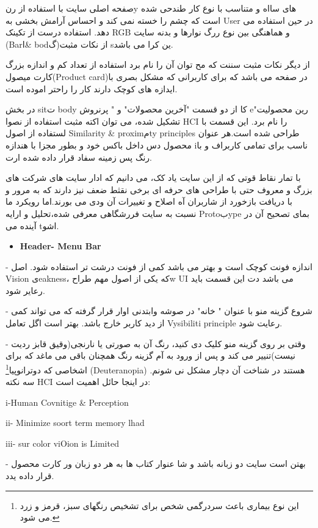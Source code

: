 \documentclass[13pt]{article}
\begin{document}
صفحه اصلی سایت با استفاده از رنy های سااه و متناسب با نوع کار طندحی شده است که
چشم را خسته نمی کند و احساس آرامش بخشی به User در حین استفاده می دهد. استفاده
درست از تکینک RGB و هماهنگی بین نوع ررگ نوارها و بدنه سایت (Barا\& bodگ)از نکات
مثبت sین کرا می باشد.

از دیگر نکات مثبت سننت که مح توان آن را نام برد استفاده از تعداد کم و اندازه
بزرگ کارت میصول(Product card)در صفحه می باشد که برای کاربرانی که مشکل بصری با
ایدازه های کوچک دارند کار را راحتر اموده است.

در بخش sitت body کا از دو قسمت "آخرین محصولات" و " پرنروش eرین محصولیت" تشکیل
شده، می توان اکته مثبت استفاده از نصوا HCI را نام برد. این قسمت با لستفاده از
اصول Similarity \& proximمty principles طراحی شده است.هر عنوان محصول دس داخل باکس
خود و بطور مجزا با هندازه iناسب برای تمامی کاربراف و با رنگ پس زمینه سفاد قرار
داده شده ارت.

با تمار نقاط قوتی که از این سایت یاد کک، می دانیم که ادار سایت های شرکت های بزرگ
و معروف حتی با طراحی های حرفه ای برخی نقثط ضعف نیز دارند که به مرور و با دریافت
بازخورد از شاربران آه اصلاح و تغییرات آن ودی می بورند.اما رویکرد ما نسبت به سایت
فررشگاهی معرفی شده،تحلیل و ارایه Protoبype بمای تصحیح آن در آینده می tاشو.

\begin{itemize}
	\item \textbf{{\small Header- Menu Bar}}
\end{itemize}

- اندازه فونت کوچک است و بهتر می باشد کمی از فونت درشت تر استفاده شود. اصل 
Vision یeakness، که یکی از اصول مهم طراحw UI می باشد دت این قسمت باید رعایر شود.

- شروع گزینه منو با عنوان " خانه" در صوشه وابتدنی اوار قرار گرفته که می تواند
کمی از دید کاربر خارج باشد. بهتر است اگل تعامل   Vysibiliti principle رعایت شود.

- وقتی بر روی گزینه منو کلیک دی کنید، رنگ آن به صورتی یا نارنجی(وقیق قابز ردیت
نیست)تنییر می کند و پس از ورود به آم گزینه رنگ همچنان باقی می ماغد که برای اشخاصی
که دوترانوپیا\footnote{این نوع بیماری باعث سردرگمی شخص برای تشخیص رنگهای سبز،
قرمز و زرد می شود.} (Deuteranopia) هستند در شناخت آن دچار مشکل نی شونم. سه نکته
HCI در اینجا حائل اهمیت است:

{\raggedright
i-Human Covnitige \& Perception
}

{\raggedright
ii- Minimize soort term memory lhad
}

{\raggedright
iii- sur color viOion is Limited
}

- بهتن است سایت دو زبانه باشد و شا عنوار کتاب ها به هر دو زبان ور کارت محصول
قرار داده یدد.
\end{document}
